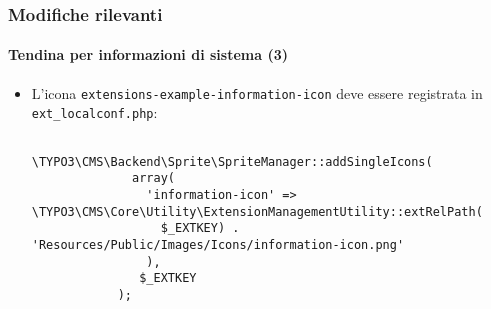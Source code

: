 \begin{frame}[fragile]
	\frametitle{Modifiche rilevanti}
	\framesubtitle{Tendina per informazioni di sistema (3)}

	\lstset{basicstyle=\tiny\ttfamily}

	\begin{itemize}
		\item L'icona \texttt{extensions-example-information-icon} deve essere registrata in \texttt{ext\_localconf.php}:
		\begin{lstlisting}
			\TYPO3\CMS\Backend\Sprite\SpriteManager::addSingleIcons(
			  array(
			    'information-icon' => \TYPO3\CMS\Core\Utility\ExtensionManagementUtility::extRelPath(
			      $_EXTKEY) . 'Resources/Public/Images/Icons/information-icon.png'
			    ),
			   $_EXTKEY
			);
		\end{lstlisting}

	\end{itemize}

\end{frame}


